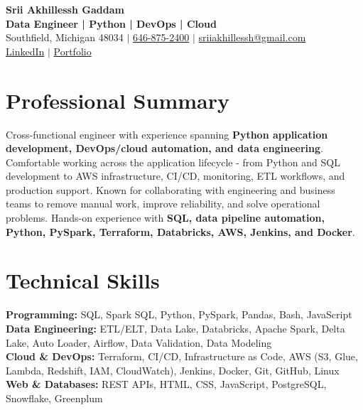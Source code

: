 \documentclass[letterpaper,10pt]{article}
\begin{document}
\fontsize{9.35pt}{10.45pt}\selectfont

\begin{center}
    {\LARGE \textbf{Srii Akhillessh Gaddam}} \\[-1pt]
    \textbf{Data Engineer | Python | DevOps | Cloud} \\[2pt]
    Southfield, Michigan 48034 $|$
    \href{tel:6468752400}{646-875-2400} $|$
    \href{mailto:sriiakhillessh@gmail.com}{sriiakhillessh@gmail.com} \\[1pt]
    \href{https://www.linkedin.com/in/srii-akhiilessh-gaddam-b48668191/}{LinkedIn} $|$
    \href{https://sriiakhillesshg.github.io/portfolio/}{Portfolio}
\end{center}
\vspace{-8pt}

\section{Professional Summary}
\small{Cross-functional engineer with experience spanning \textbf{Python application development, DevOps/cloud automation, and data engineering}. Comfortable working across the application lifecycle - from Python and SQL development to AWS infrastructure, CI/CD, monitoring, ETL workflows, and production support. Known for collaborating with engineering and business teams to remove manual work, improve reliability, and solve operational problems. Hands-on experience with \textbf{SQL, data pipeline automation, Python, PySpark, Terraform, Databricks, AWS, Jenkins, and Docker}.}

\section{Technical Skills}
\small{
\textbf{Programming:} SQL, Spark SQL, Python, PySpark, Pandas, Bash, JavaScript \\
\textbf{Data Engineering:} ETL/ELT, Data Lake, Databricks, Apache Spark, Delta Lake, Auto Loader, Airflow, Data Validation, Data Modeling \\
\textbf{Cloud \& DevOps:} Terraform, CI/CD, Infrastructure as Code, AWS (S3, Glue, Lambda, Redshift, IAM, CloudWatch), Jenkins, Docker, Git, GitHub, Linux \\
\textbf{Web \& Databases:} REST APIs, HTML, CSS, JavaScript, PostgreSQL, Snowflake, Greenplum
}
\end{document}
